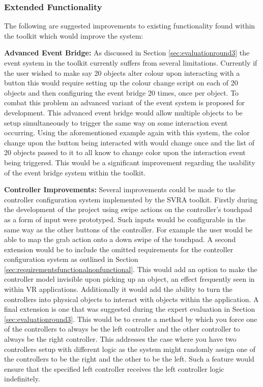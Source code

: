 \documentclass{l4proj}
\begin{document}
\subsubsection{Extended Functionality}
The following are suggested improvements to existing functionality found within the toolkit which would improve the system:

\textbf{Advanced Event Bridge:} As discussed in Section \ref{sec:evaluationround3} the event system in the toolkit currently suffers from several limitations. Currently if the user wished to make say 20 objects alter colour upon interacting with a button this would require setting up the colour change script on each of 20 objects and then configuring the event bridge 20 times, once per object. To combat this problem an advanced variant of the event system is proposed for development. This advanced event bridge would allow multiple objects to be setup simultaneously to trigger the same way on some interaction event occurring. Using the aforementioned example again with this system, the color change upon the button being interacted with would change once and the list of 20 objects passed to it to all know to change color upon the interaction event being triggered. This would be a significant improvement regarding the usability of the event bridge system within the toolkit.

\textbf{Controller Improvements:} Several improvements could be made to the controller configuration system implemented by the SVRA toolkit. Firstly during the development of the project using swipe actions on the controller's touchpad as a form of input were prototyped. Such inputs would be configurable in the same way as the other buttons of the controller. For example the user would be able to map the grab action onto a down swipe of the touchpad. A second extension would be to include the omitted requirements for the controller configuration system as outlined in Section \ref{sec:requirementsfunctionalnonfunctional}. This would add an option to make the controller model invisible upon picking up an object, an effect frequently seen in within VR applications. Additionally it would add the ability to turn the controllers into physical objects to interact with objects within the application. A final extension is one that was suggested during the expert evaluation in Section \ref{sec:evaluationround3}. This would be to create a method by which you force one of the controllers to always be the left controller and the other controller to always be the right controller. This addresses the case where you have two controllers setup with different logic as the system might randomly assign one of the controllers to be the right and the other to be the left. Such a feature would ensure that the specified left controller receives the left controller logic indefinitely.
\end{document}
